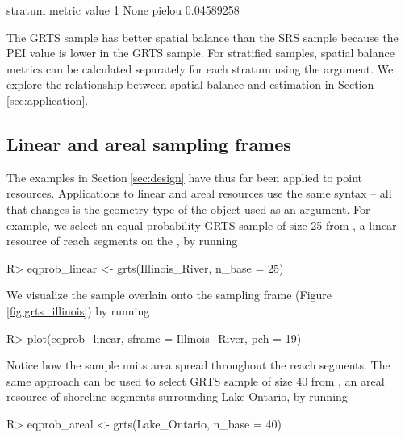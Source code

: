 \documentclass[
  shortnames]{jss}
\begin{document}
\begin{CodeChunk}
\begin{CodeOutput}
  stratum metric      value
1    None pielou 0.04589258
\end{CodeOutput}
\end{CodeChunk}

The GRTS sample has better spatial balance than the SRS sample because
the PEI value is lower in the GRTS sample. For stratified samples,
spatial balance metrics can be calculated separately for each stratum
using the  argument. We explore the relationship
between spatial balance and estimation in
Section\(~\)\ref{sec:application}.

\hypertarget{linear-and-areal-sampling-frames}{%
\subsection{Linear and areal sampling
frames}\label{linear-and-areal-sampling-frames}}

The examples in Section\(~\)\ref{sec:design} have thus far been applied
to point resources. Applications to linear and areal resources use the
same syntax -- all that changes is the geometry type of the 
object used as an argument. For example, we select an equal probability
GRTS sample of size 25 from , a linear resource of
reach segments on the , by running

\begin{CodeChunk}
\begin{CodeInput}
R> eqprob_linear <- grts(Illinois_River, n_base = 25)
\end{CodeInput}
\end{CodeChunk}

We visualize the sample overlain onto the sampling frame
(Figure\(~\)\ref{fig:grts_illinois}) by running

\begin{CodeChunk}
\begin{CodeInput}
R> plot(eqprob_linear, sframe = Illinois_River, pch = 19)
\end{CodeInput}
\end{CodeChunk}

Notice how the sample units area spread throughout the reach segments.
The same approach can be used to select GRTS sample of size 40 from
, an areal resource of shoreline segments surrounding
Lake Ontario, by running

\begin{CodeChunk}
\begin{CodeInput}
R> eqprob_areal <- grts(Lake_Ontario, n_base = 40)
\end{CodeInput}
\end{CodeChunk}
\end{document}
